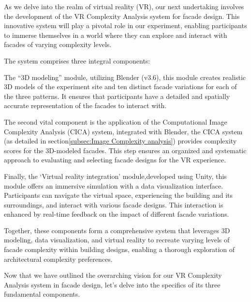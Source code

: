 As we delve into the realm of virtual reality (VR), our next undertaking involves the development of the VR Complexity Analysis system for facade design.
This innovative system will play a pivotal role in our experiment, enabling participants to immerse themselves in a world where they can explore and interact with facades of varying complexity levels.

The system comprises three integral components:

The ``3D modeling'' module, utilizing Blender (v3.6), this module creates realistic 3D models of the experiment site and ten distinct facade variations for each of the three patterns.
It ensures that participants have a detailed and spatially accurate representation of the facades to interact with.

The second vital component is the application of the Computational Image Complexity Analysis (CICA) system, integrated with Blender, the CICA system (as detailed in section\ref{subsec:Image Complexity analysis}) provides complexity scores for the 3D-modeled facades.
This step ensures an organized and systematic approach to evaluating and selecting facade designs for the VR experience.

Finally, the `Virtual reality integration' module,developed using Unity, this module offers an immersive simulation with a data visualization interface.
Participants can navigate the virtual space, experiencing the building and its surroundings, and interact with various facade designs.
This interaction is enhanced by real-time feedback on the impact of different facade variations.

Together, these components form a comprehensive system that leverages 3D modeling, data visualization, and virtual reality to recreate varying levels of facade complexity within building designs, enabling a thorough exploration of architectural complexity preferences.

Now that we have outlined the overarching vision for our VR Complexity Analysis system in facade design, let's delve into the specifics of its three fundamental components.


